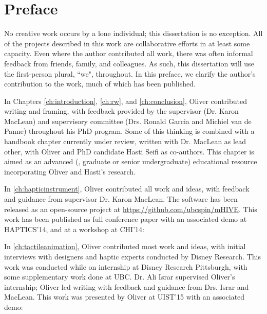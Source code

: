 
\chapter{Preface}
No creative work occurs by a lone individual; this dissertation is no exception.
All of the projects described in this work are collaborative efforts in at least some capacity.
Even where the author contributed all work, there was often informal feedback from friends, family, and colleagues.
As such, this dissertation will use the first-person plural, ``we", throughout.
In this preface, we clarify the author's contribution to the work, much of which has been published.

In Chapters \ref{ch:introduction}, \ref{ch:rw}, and \ref{ch:conclusion}, Oliver contributed writing and framing, with feedback provided by the supervisor (Dr. Karon MacLean) and supervisory committee (Drs. Ronald Garcia and Michiel van de Panne) throughout his PhD program. 
Some of this thinking  is combined with a handbook chapter currently under review, written with Dr. MacLean as lead other, with Oliver and PhD candidate Hasti Seifi as co-authors.
This chapter is aimed as an advanced (\ie, graduate or senior undergraduate) educational resource incorporating Oliver and Hasti's research.

In \autoref{ch:hapticinstrument}, Oliver contributed all work and ideas, with feedback and guidance from supervisor Dr. Karon MacLean.
The software has been released as an open-source project at \url{https://github.com/ubcspin/mHIVE}.
This work has been published as full conference paper with an associated demo at HAPTICS'14, and at a workshop at CHI'14:


\noindent
In \autoref{ch:tactileanimation}, Oliver contributed most work and ideas, with initial interviews with designers and haptic experts conducted by Disney Research.
This work was conducted while on internship at Disney Research Pittsburgh, with some supplementary work done at UBC.
Dr. Ali Israr supervised Oliver's internship; Oliver led writing with feedback and guidance from Drs. Israr and MacLean.
This work was presented by Oliver at UIST'15 with an associated demo:

